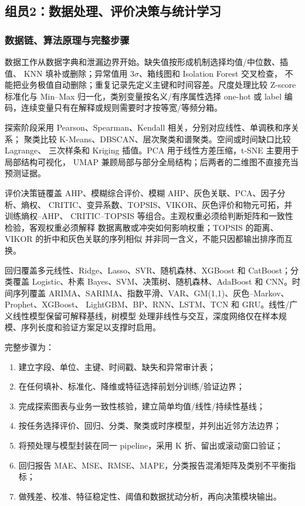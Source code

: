 \documentclass[UTF8,a4paper,12pt]{ctexart}
\begin{document}
\subsection{组员2：数据处理、评价决策与统计学习}

\subsubsection{数据链、算法原理与完整步骤}

数据工作从数据字典和泄漏边界开始。缺失值按形成机制选择均值/中位数、插值、
KNN 填补或删除；异常值用 $3\sigma$、箱线图和 Isolation Forest 交叉检查，
不能把业务极值自动删除；重复记录先定义主键和时间容差。尺度处理比较
Z-score 标准化与 Min--Max 归一化，类别变量按名义/有序属性选择 one-hot 或
label 编码，连续变量只有在解释或规则需要时才按等宽/等频分箱。

探索阶段采用 Pearson、Spearman、Kendall 相关，分别对应线性、单调秩和序关系；
聚类比较 K-Means、DBSCAN、层次聚类和谱聚类。空间或时间缺口比较 Lagrange、
三次样条和 Kriging 插值。PCA 用于线性方差压缩，t-SNE 主要用于局部结构可视化，
UMAP 兼顾局部与部分全局结构；后两者的二维图不直接充当预测证据。

评价决策链覆盖 AHP、模糊综合评价、模糊 AHP、灰色关联、PCA、因子分析、熵权、
CRITIC、变异系数、TOPSIS、VIKOR、灰色评价和物元可拓，并训练熵权--AHP、
CRITIC--TOPSIS 等组合。主观权重必须给判断矩阵和一致性检验，客观权重必须解释
数据离散或冲突如何影响权重；TOPSIS 的距离、VIKOR 的折中和灰色关联的序列相似
并非同一含义，不能只因都输出排序而互换。

回归覆盖多元线性、Ridge、Lasso、SVR、随机森林、XGBoost 和 CatBoost；分类覆盖
Logistic、朴素 Bayes、SVM、决策树、随机森林、AdaBoost 和 CNN。时间序列覆盖
ARIMA、SARIMA、指数平滑、VAR、GM(1,1)、灰色--Markov、Prophet、XGBoost、
LightGBM、BP、RNN、LSTM、TCN 和 GRU。线性/广义线性模型保留可解释基线，树模型
处理非线性与交互，深度网络仅在样本规模、序列长度和验证方案足以支撑时启用。

完整步骤为：
\begin{enumerate}
  \item 建立字段、单位、主键、时间戳、缺失和异常审计表；
  \item 在任何填补、标准化、降维或特征选择前划分训练/验证边界；
  \item 完成探索图表与业务一致性核验，建立简单均值/线性/持续性基线；
  \item 按任务选择评价、回归、分类、聚类或时序模型，并列出近邻方法边界；
  \item 将预处理与模型封装在同一 pipeline，采用 K 折、留出或滚动窗口验证；
  \item 回归报告 MAE、MSE、RMSE、MAPE，分类报告混淆矩阵及类别不平衡指标；
  \item 做残差、校准、特征稳定性、阈值和数据扰动分析，再向决策模块输出。
\end{enumerate}
\end{document}
